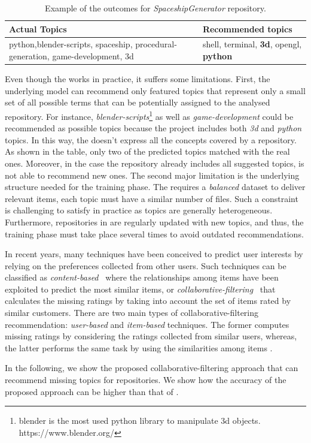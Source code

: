 \begin{table}[h]
\centering
\resizebox{8.5cm}{!} {
\footnotesize
\begin{tabular}{| p{3.2cm} | p{3.2cm} | }
\hline
 \textbf{Actual Topics} &\textbf{ Recommended topics} \\ \hline
     python,blender-scripts, spaceship, procedural-generation, 
     game-development, 3d        &  
  shell, terminal, \textbf{3d},    opengl,    \textbf{python}        \\ \hline

\end{tabular}
}
\caption{Example of the \MNB outcomes for \emph{SpaceshipGenerator} repository.}
\label{tab:example}
\end{table} 


Even though the \MNB works in practice, it suffers some limitations. First, the 
underlying model can recommend only featured topics that represent only a small 
set of all possible terms that can be potentially assigned to the analysed 
repository.
%
For instance, \emph{blender-scripts}\footnote{blender is the most used python 
library to manipulate 3d objects. \url{}https://www.blender.org/} as well as 
\emph{game-development} could be recommended as possible topics because the 
project includes both \emph{3d} and \emph{python} topics.
In this way, the \MNB doesn't express all the concepts covered by a \GH 
repository. As shown in the table, only two of the predicted topics matched 
with the real ones. Moreover, in the case the repository already includes all 
suggested topics, \MNB is not able to recommend new ones.
The second major limitation is the underlying structure needed for the training 
phase. The \MNB requires a \emph{balanced} dataset to deliver relevant items, 
\ie each topic must have a similar number of  \RM files. Such a constraint is 
challenging to satisfy in practice as topics are generally heterogeneous. 
Furthermore, repositories in \GH are regularly updated with new topics, and 
thus, the training phase must take place several times to avoid outdated 
recommendations. 

In recent years, many techniques have been conceived to predict user interests 
by relying on the preferences collected from other users. Such techniques can 
be classified as  \emph{content-based}~\cite{Pazzani2007} where the 
relationships among items have been exploited to predict the most similar items,
or \emph{collaborative-filtering}~\cite{Miranda:2008:ICF:1486927.1487083} that 
calculates the missing ratings by taking into account the set of items rated by 
similar customers. There are two main types of collaborative-filtering 
recommendation: \emph{user-based} \cite{Zhao:2010:UCR:1748610.1749278} and 
\emph{item-based} \cite{Sarwar:2001:ICF:371920.372071} techniques. The former 
computes missing ratings by considering the ratings collected from similar 
users, whereas, the latter performs the same task by using the similarities 
among items \cite{Cremonesi:2008:EMC:1468165.1468327}.

In the following, we show the proposed collaborative-filtering approach that 
can recommend missing topics for \GH repositories. We show how the accuracy of 
the proposed approach can be higher than that of \MNB.
